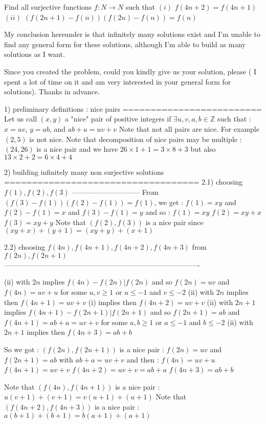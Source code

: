 \begin{solution}
	\begin{tcolorbox}Find all surjective  functions $f: N \to N$ such that
$(i)$ $f(4n+2)=f(4n+1)$
$(ii)$ $(f(2n+1)-f(n))(f(2n)-f(n))=f(n)$\end{tcolorbox}
My conclusion hereunder is that infinitely many solutions exist and I'm unable to find  any general form for these solutions, although I'm able to build as many solutions as I want.

Since you created the problem, could you kindly give us your solution, please ( I spent a lot of time on it and am very interested in your general form for solutions).
Thanks in advance.

1) preliminary definitions : nice pairs
=========================
Let us call $(x,y)$ a "nice" pair of positive integers if $\exists u,v,a,b\in\mathbb Z$ such that :
$x=uv$, $y=ab$, and $ab+a=uv+v$
Note that not all pairs are nice. For example $(2,5)$ is not nice.
Note that decomposition of nice pairs may be multiple : $(24,26)$ is a nice pair and we have $26\times 1+1=3\times 8+3$ but also $13\times 2+2=6\times 4+4$

2) building infinitely many non surjective solutions
===================================
2.1) choosing $f(1),f(2),f(3)$
-----------------------------
From $(f(3)-f(1))(f(2)-f(1))=f(1)$, we get :
$f(1)=xy$ and $f(2)-f(1)=x$ and $f(3)-f(1)=y$ and so :
$f(1)=xy$
$f(2)=xy+x$
$f(3)=xy+y$
Note that $(f(2),f(3))$ is a nice pair since $(xy+x)+(y+1)=(xy+y)+(x+1)$

2.2) choosing $f(4n),f(4n+1),f(4n+2),f(4n+3)$ from $f(2n),f(2n+1)$
----------------------------------------------------------------------------------

(ii) with $2n$ implies $f(4n)-f(2n)|f(2n)$ and so $f(2n)=uv$ and $f(4n)=uv+u$ for some $u,v\ge 1$ or $u\le -1$ and $v\le -2$
(ii) with $2n$ implies then $f(4n+1)=uv+v$
(i) implies then $f(4n+2)=uv+v$
(ii) with $2n+1$ implies $f(4n+1)-f(2n+1)|f(2n+1)$ and so $f(2n+1)=ab$ and $f(4n+1)=ab+a=uv+v$ for some $a,b\ge 1$ or $a\le -1$ and $b\le -2$
(ii) with $2n+1$ implies then $f(4n+3)=ab+b$

So we got :
$(f(2n),f(2n+1))$ is a nice pair : $f(2n)=uv$ and $f(2n+1)=ab$ with $ab+a=uv+v$ and then :
$f(4n)=uv+u$
$f(4n+1)=uv+v$
$f(4n+2)=uv+v=ab+a$
$f(4n+3)=ab+b$

Note that $(f(4n),f(4n+1))$ is a nice pair : $u(v+1)+(v+1)=v(u+1)+(u+1)$
Note that $(f(4n+2),f(4n+3))$ is a nice pair : $a(b+1)+(b+1)=b(a+1)+(a+1)$


\end{solution}
